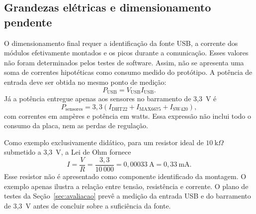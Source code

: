 \subsection{Grandezas elétricas e dimensionamento pendente}

O dimensionamento final requer a identificação da fonte USB, a corrente
dos módulos efetivamente montados e os picos durante a comunicação. Esses
valores não foram determinados pelos testes de software. Assim, não se
apresenta uma soma de correntes hipotéticas como consumo medido do protótipo.
A potência de entrada deve ser obtida no mesmo ponto de medição:
\begin{equation}
P_{\mathrm{USB}} = V_{\mathrm{USB}} I_{\mathrm{USB}}.
\end{equation}
Já a potência entregue apenas aos sensores no barramento de 3,3~V é
\begin{equation}
P_{\mathrm{sensores}} =
3{,}3\left(I_{\mathrm{DHT22}}+I_{\mathrm{MAX6675}}+I_{\mathrm{SW420}}\right),
\end{equation}
com correntes em ampères e potência em watts. Essa expressão não inclui
todo o consumo da placa, nem as perdas de regulação.

Como exemplo exclusivamente didático, para um resistor ideal de
$10~\mathrm{k}\Omega$ submetido a 3,3~V, a Lei de Ohm fornece
\begin{equation}
I=\frac{V}{R}=\frac{3{,}3}{10\,000}
=0{,}00033~\mathrm{A}=0{,}33~\mathrm{mA}.
\end{equation}
Esse resistor não é apresentado como componente identificado da montagem.
O exemplo apenas ilustra a relação entre tensão, resistência e corrente.
O plano de testes da Seção~\ref{sec:avaliacao} prevê a medição da entrada
USB e do barramento de 3,3~V antes de concluir sobre a suficiência da fonte.
\FloatBarrier
